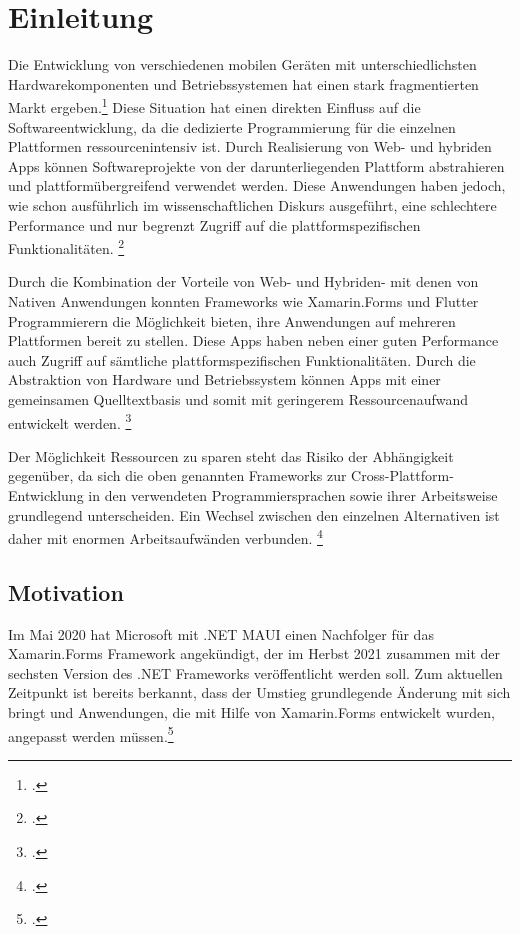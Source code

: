 \chapter{Einleitung}
Die Entwicklung von verschiedenen mobilen Geräten mit unterschiedlichsten Hardwarekomponenten und Betriebssystemen hat einen stark fragmentierten Markt ergeben.\footcite[Vgl.][S. 3]{Joorabchi2016}  Diese Situation hat einen direkten Einfluss auf die Softwareentwicklung, da die dedizierte Programmierung für die einzelnen Plattformen ressourcenintensiv ist.  Durch Realisierung von Web- und hybriden Apps können Softwareprojekte von der darunterliegenden Plattform abstrahieren und plattformübergreifend verwendet werden.  Diese Anwendungen haben jedoch, wie schon ausführlich im wissenschaftlichen Diskurs ausgeführt,  eine schlechtere Performance und nur begrenzt Zugriff auf die plattform\-spezifischen Funktionalitäten.  \footcite[Vgl.][S. 110ff.]{Barton2016} 

Durch die Kombination der Vorteile von Web- und Hybriden- mit denen von Nativen Anwendungen konnten Frameworks wie Xamarin.Forms und Flutter Programmierern die Möglichkeit bieten,  ihre Anwendungen auf mehreren Plattformen bereit zu stellen.  Diese Apps haben neben einer guten Performance auch Zugriff auf sämtliche plattformspezifischen Funktionalitäten.  Durch die Abstraktion von Hardware und Betriebssystem können Apps mit einer gemeinsamen Quelltextbasis und somit mit geringerem Ressourcenaufwand entwickelt werden. \footcite[Vgl.][S. 295]{Vollmer2017} 

Der Möglichkeit Ressourcen zu sparen steht das Risiko der Abhängigkeit gegenüber, da sich die oben genannten Frameworks zur Cross-Plattform-Entwicklung in den verwendeten Programmiersprachen sowie ihrer Arbeitsweise grundlegend unterscheiden.  Ein Wechsel zwischen den einzelnen Alternativen ist daher mit enormen Arbeitsaufwänden verbunden. \footcite[Vgl.][S. 64]{Wissel2017}  

\section{Motivation}
Im Mai 2020 hat Microsoft mit .NET MAUI einen Nachfolger für das Xamarin.Forms Framework angekündigt, der im Herbst 2021 zusammen mit der sechsten Version des .NET Frameworks veröffentlicht werden soll. Zum aktuellen Zeitpunkt ist bereits berkannt, dass der Umstieg grundlegende Änderung mit sich bringt und Anwendungen,  die mit Hilfe von Xamarin.Forms entwickelt wurden,  angepasst werden müssen.\footcite[Vgl.][Abgerufen am 28.10.2020]{Hunter2020}

